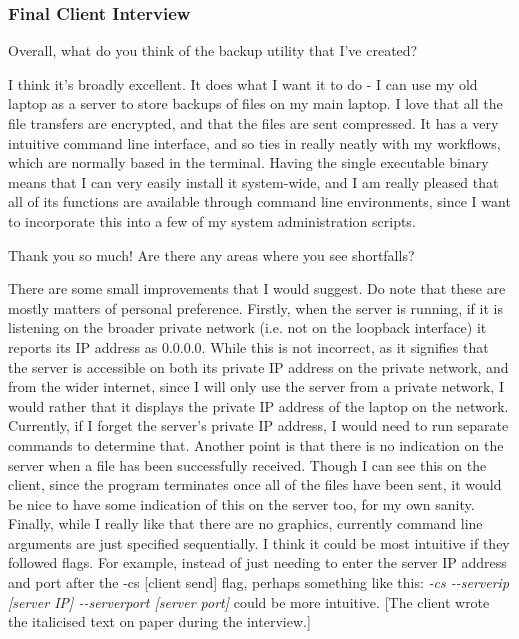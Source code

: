 \documentclass[../main.tex]{subfiles}
\begin{document}
\subsubsection{Final Client Interview}
\begin{qanda}
\Q Overall, what do you think of the backup utility that I’ve created? 

\A I think it’s broadly excellent. It does what I want it to do - I can use my old laptop as a server to store backups of files on my main laptop. I love that all the file transfers are encrypted, and that the files are sent compressed. It has a very intuitive command line interface, and so ties in really neatly with my workflows, which are normally based in the terminal. Having the single executable binary means that I can very easily install it system-wide, and I am really pleased that all of its functions are available through command line environments, since I want to incorporate this into a few of my system administration scripts. 

\Q Thank you so much! Are there any areas where you see shortfalls? 

\A There are some small improvements that I would suggest. Do note that these are mostly matters of personal preference. Firstly, when the server is running, if it is listening on the broader private network (i.e. not on the loopback interface) it reports its IP address as 0.0.0.0. While this is not incorrect, as it signifies that the server is accessible on both its private IP address on the private network, and from the wider internet, since I will only use the server from a private network, I would rather that it displays the private IP address of the laptop on the network. Currently, if I forget the server’s private IP address, I would need to run separate commands to determine that. Another point is that there is no indication on the server when a file has been successfully received. Though I can see this on the client, since the program terminates once all of the files have been sent, it would be nice to have some indication of this on the server too, for my own sanity. Finally, while I really like that there are no graphics, currently command line arguments are just specified sequentially. I think it could be most intuitive if they followed flags. For example, instead of just needing to enter the server IP address and port after the -cs [client send] flag, perhaps something like this: \textit{-cs -\--serverip [server IP] -\--serverport [server port]} could be more intuitive. [The client wrote the italicised text on paper during the interview.] 


\end{qanda}
\end{document}
